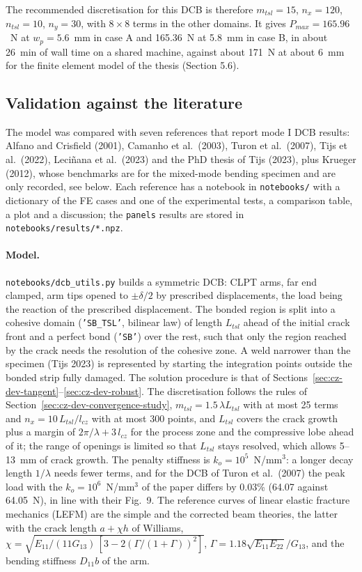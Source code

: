 The recommended discretisation for this DCB is therefore $m_{tsl} = 15$, $n_x = 120$, $n_{tsl} = 10$, $n_y = 30$, with $8 \times 8$ terms in the other domains. It gives $P_{max} = 165.96$~N at $w_p = 5.6$~mm in case A and 165.36~N at 5.8~mm in case B, in about 26~min of wall time on a shared machine, against about 171~N at about 6~mm for the finite element model of the thesis (Section 5.6).

\subsection{Validation against the literature}\label{sec:cz-dev-validation}

The model was compared with seven references that report mode I DCB results: Alfano and Crisfield (2001), Camanho et al.\ (2003), Turon et al.\ (2007), Tijs et al.\ (2022), Leci\~nana et al.\ (2023) and the PhD thesis of Tijs (2023), plus Krueger (2012), whose benchmarks are for the mixed-mode bending specimen and are only recorded, see below. Each reference has a notebook in \texttt{notebooks/} with a dictionary of the FE cases and one of the experimental tests, a comparison table, a plot and a discussion; the \texttt{panels} results are stored in \texttt{notebooks/results/*.npz}.

\paragraph{Model.} \texttt{notebooks/dcb\_utils.py} builds a symmetric DCB: CLPT arms, far end clamped, arm tips opened to $\pm\delta/2$ by prescribed displacements, the load being the reaction of the prescribed displacement. The bonded region is split into a cohesive domain (\texttt{'SB\_TSL'}, bilinear law) of length $L_{tsl}$ ahead of the initial crack front and a perfect bond (\texttt{'SB'}) over the rest, such that only the region reached by the crack needs the resolution of the cohesive zone. A weld narrower than the specimen (Tijs 2023) is represented by starting the integration points outside the bonded strip fully damaged. The solution procedure is that of Sections~\ref{sec:cz-dev-tangent}--\ref{sec:cz-dev-robust}. The discretisation follows the rules of Section~\ref{sec:cz-dev-convergence-study}, $m_{tsl} = 1.5\,\lambda L_{tsl}$ with at most 25 terms and $n_x = 10\,L_{tsl}/l_{cz}$ with at most 300 points, and $L_{tsl}$ covers the crack growth plus a margin of $2\pi/\lambda + 3\,l_{cz}$ for the process zone and the compressive lobe ahead of it; the range of openings is limited so that $L_{tsl}$ stays resolved, which allows 5--13~mm of crack growth. The penalty stiffness is $k_o = 10^5$~N/mm$^3$: a longer decay length $1/\lambda$ needs fewer terms, and for the DCB of Turon et al.\ (2007) the peak load with the $k_o = 10^6$~N/mm$^3$ of the paper differs by 0.03\% (64.07 against 64.05~N), in line with their Fig.~9. The reference curves of linear elastic fracture mechanics (LEFM) are the simple and the corrected beam theories, the latter with the crack length $a + \chi h$ of Williams, $\chi = \sqrt{E_{11}/(11 G_{13})\,[3 - 2(\Gamma/(1+\Gamma))^2]}$, $\Gamma = 1.18\sqrt{E_{11}E_{22}}/G_{13}$, and the bending stiffness $D_{11} b$ of the arm.

